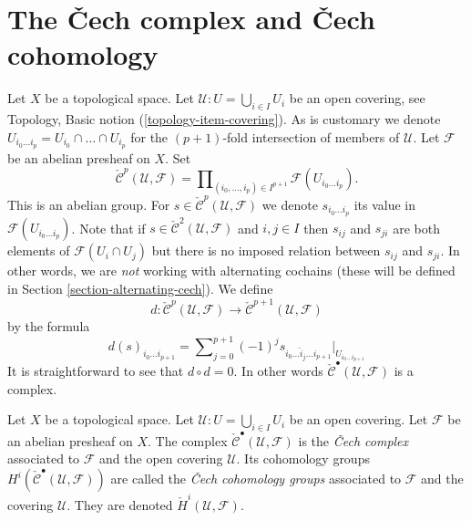 \section{The {\v C}ech complex and {\v C}ech cohomology}
\label{section-cech}

\noindent
Let $X$ be a topological space.
Let $\mathcal{U} : U = \bigcup_{i \in I} U_i$ be an open covering,
see Topology, Basic notion (\ref{topology-item-covering}).
As is customary we denote
$U_{i_0\ldots i_p} = U_{i_0} \cap \ldots \cap U_{i_p}$ for the
$(p + 1)$-fold intersection of members of $\mathcal{U}$.
Let $\mathcal{F}$ be an abelian presheaf on $X$.
Set
$$
\check{\mathcal{C}}^p(\mathcal{U}, \mathcal{F})
=
\prod\nolimits_{(i_0, \ldots, i_p) \in I^{p + 1}}
\mathcal{F}(U_{i_0\ldots i_p}).
$$
This is an abelian group. For
$s \in \check{\mathcal{C}}^p(\mathcal{U}, \mathcal{F})$ we denote
$s_{i_0\ldots i_p}$ its value in $\mathcal{F}(U_{i_0\ldots i_p})$.
Note that if $s \in \check{\mathcal{C}}^2(\mathcal{U}, \mathcal{F})$
and $i, j \in I$ then $s_{ij}$ and $s_{ji}$ are both elements
of $\mathcal{F}(U_i \cap U_j)$ but there is no imposed
relation between $s_{ij}$ and $s_{ji}$. In other words, we are {\it not}
working with alternating cochains (these will be defined
in Section \ref{section-alternating-cech}). We define
$$
d : \check{\mathcal{C}}^p(\mathcal{U}, \mathcal{F})
\longrightarrow
\check{\mathcal{C}}^{p + 1}(\mathcal{U}, \mathcal{F})
$$
by the formula
\begin{equation}
\label{equation-d-cech}
d(s)_{i_0\ldots i_{p + 1}}
=
\sum\nolimits_{j = 0}^{p + 1}
(-1)^j
s_{i_0\ldots \hat i_j \ldots i_{p + 1}}|_{U_{i_0\ldots i_{p + 1}}}
\end{equation}
It is straightforward to see that $d \circ d = 0$. In other words
$\check{\mathcal{C}}^\bullet(\mathcal{U}, \mathcal{F})$ is a complex.

\begin{definition}
\label{definition-cech-complex}
Let $X$ be a topological space.
Let $\mathcal{U} : U = \bigcup_{i \in I} U_i$ be an open covering.
Let $\mathcal{F}$ be an abelian presheaf on $X$.
The complex $\check{\mathcal{C}}^\bullet(\mathcal{U}, \mathcal{F})$
is the {\it {\v C}ech complex} associated to $\mathcal{F}$ and the
open covering $\mathcal{U}$. Its cohomology groups
$H^i(\check{\mathcal{C}}^\bullet(\mathcal{U}, \mathcal{F}))$ are
called the {\it {\v C}ech cohomology groups} associated to
$\mathcal{F}$ and the covering $\mathcal{U}$.
They are denoted $\check H^i(\mathcal{U}, \mathcal{F})$.
\end{definition}

